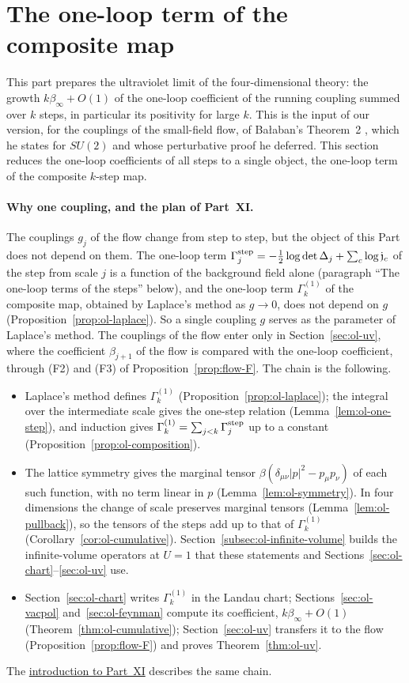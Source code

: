 \section{The one-loop term of the composite map}\label{sec:ol-composite}

This part prepares the ultraviolet limit of the four-dimensional theory: the growth $k\beta_\infty+O(1)$ of the one-loop coefficient of the running coupling summed over $k$ steps, in particular its positivity for large $k$. This is the input of our version, for the couplings of the small-field flow, of Ba\l aban's Theorem~2 \cite{BalYM4I}, which he states for $SU(2)$ and whose perturbative proof he deferred. This section reduces the one-loop coefficients of all steps to a single object, the one-loop term of the composite $k$-step map.

\paragraph{Why one coupling, and the plan of Part~XI.} The couplings $g_j$ of the flow change from step to step, but the object of this Part does not depend on them. The one-loop term $\Gamma^{\rm step}_j=-\frac12\log\det\Delta_j+\sum_c\log\mathfrak j_c$ of the step from scale $j$ is a function of the background field alone (paragraph ``The one-loop terms of the steps'' below), and the one-loop term $\Gamma^{(1)}_k$ of the composite map, obtained by Laplace's method as $g\to0$, does not depend on $g$ (Proposition~\ref{prop:ol-laplace}). So a single coupling $g$ serves as the parameter of Laplace's method. The couplings of the flow enter only in Section~\ref{sec:ol-uv}, where the coefficient $\beta_{j+1}$ of the flow is compared with the one-loop coefficient, through (F2) and (F3) of Proposition~\ref{prop:flow-F}. The chain is the following.
\begin{itemize}
\item Laplace's method defines $\Gamma^{(1)}_k$ (Proposition~\ref{prop:ol-laplace}); the integral over the intermediate scale gives the one-step relation (Lemma~\ref{lem:ol-one-step}), and induction gives $\Gamma^{(1)}_k=\sum_{j<k}\Gamma^{\rm step}_j$ up to a constant (Proposition~\ref{prop:ol-composition}).
\item The lattice symmetry gives the marginal tensor $\beta(\delta_{\mu\nu}|p|^2-p_\mu p_\nu)$ of each such function, with no term linear in $p$ (Lemma~\ref{lem:ol-symmetry}). In four dimensions the change of scale preserves marginal tensors (Lemma~\ref{lem:ol-pullback}), so the tensors of the steps add up to that of $\Gamma^{(1)}_k$ (Corollary~\ref{cor:ol-cumulative}). Section~\ref{subsec:ol-infinite-volume} builds the infinite-volume operators at $U=1$ that these statements and Sections~\ref{sec:ol-chart}--\ref{sec:ol-uv} use.
\item Section~\ref{sec:ol-chart} writes $\Gamma^{(1)}_k$ in the Landau chart; Sections~\ref{sec:ol-vacpol} and~\ref{sec:ol-feynman} compute its coefficient, $k\beta_\infty+O(1)$ (Theorem~\ref{thm:ol-cumulative}); Section~\ref{sec:ol-uv} transfers it to the flow (Proposition~\ref{prop:flow-F}) and proves Theorem~\ref{thm:ol-uv}.
\end{itemize}
The \hyperref[intro:XI]{introduction to Part~XI} describes the same chain.

